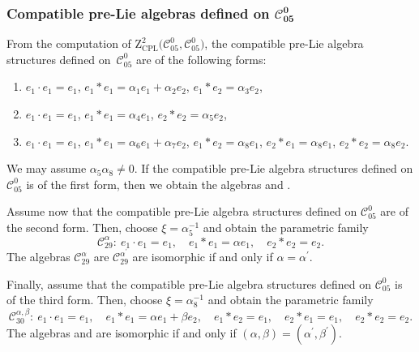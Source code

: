 \documentclass[pdftex]{sigma}
\numberwithin{equation}{section}
\begin{document}
\subsubsection[Compatible pre-Lie algebras defined on C\_\{05\}\^{}0]{Compatible pre-Lie algebras defined on $\boldsymbol{\mathcal{C}_{05}^{0}}$}

From the computation of $\mathrm{Z}_{\mathrm{CPL}}^{2}\bigl(\mathcal{C}_{05}^{0},%
\mathcal{C}_{05}^{0}\bigr)$, the compatible pre-Lie algebra structures defined on~$\mathcal{C}_{05}^{0}$ are of the following forms:
\begin{enumerate}\itemsep=0pt
\item[(1)] $e_{1}\cdot e_{1}=e_{1}$,
$e_{1}\ast e_{1}=\alpha _{1}e_{1}+\alpha _{2}e_{2}$, $e_{1}\ast
e_{2}=\alpha _{3}e_{2}$,
\item[(2)] $e_{1}\cdot e_{1}=e_{1}$, $e_{1}\ast e_{1}=\alpha _{4}e_{1}$, $e_{2}\ast e_{2}=\alpha _{5}e_{2}$,
\item[(3)] $e_{1}\cdot e_{1}=e_{1}$, $e_{1}\ast e_{1}=\alpha _{6}e_{1}+\alpha _{7}e_{2}$, $e_{1}\ast
e_{2}=\alpha _{8}e_{1}$, $e_{2}\ast e_{1}=\alpha _{8}e_{1}$, $e_{2}\ast
e_{2}=\alpha _{8}e_{2}$.
\end{enumerate}

We may assume $\alpha _{5}\alpha _{8}\neq 0$.
If the compatible pre-Lie
algebra structures defined on $\mathcal{C}_{05}^{0}$ is of the first form,
then we obtain the algebras 
and .

Assume now that the
compatible pre-Lie algebra structures defined on $\mathcal{C}_{05}^{0}$ are
of the second form. Then, choose $\xi ={\alpha^{-1} _{5}}$ and obtain the
parametric family
\[
\mathcal{C}_{29}^{\alpha }\colon \
e_{1}\cdot e_{1}=e_{1}, \quad
e_{1}\ast e_{1}=\alpha e_{1}, \quad e_{2}\ast e_{2}=e_{2}.
\]
The algebras $\mathcal{C}_{29}^{\alpha }$ are $\mathcal{C}_{29}^{\alpha ^{\prime
}} $ are isomorphic if and only if $\alpha =\alpha ^{\prime }$.

Finally,
assume that the compatible pre-Lie algebra structures defined on $\mathcal{C}%
_{05}^{0}$ is of the third form. Then, choose $\xi ={\alpha^{-1} _{8}}$
and obtain the parametric family
\[
\mathcal{C}_{30}^{\alpha ,\beta } \colon \
e_{1}\cdot e_{1}=e_{1}, \quad
e_{1}\ast e_{1}=\alpha e_{1}+\beta e_{2}, \quad e_{1}\ast e_{2}=e_{1}, \quad
e_{2}\ast e_{1}=e_{1}, \quad e_{2}\ast e_{2}=e_{2}.
\]
The algebras  and  are isomorphic if and only if $(\alpha,\beta)= (\alpha^{\prime },\beta ^{\prime })$.
\end{document}
